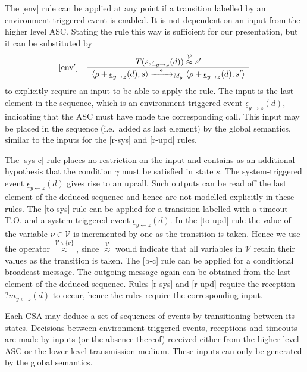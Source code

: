\documentclass{sig-alternate}
\newcommand{\e}{\epsilon}
\newcommand{\V}{\mathcal{V}}
\newcommand{\timeout}{\mathrm{T.O.}}
\newcommand{\locev}[1]{\underline{#1}}
\newcommand{\vareq}[1]{\overset{#1}{\approx}}
\newcommand{\env}[4]{\locev{#1}_{{#2} \rightarrow {#3}}(#4)}
\newcommand{\sys}[4]{\locev{#1}_{{#2} \leftarrow {#3}}(#4)}
\begin{document}
The [env] rule can be applied at any point if a transition labelled by an environment-triggered event is enabled. It is not dependent on an input from the higher level ASC. Stating the rule this way is sufficient for our presentation, but it can be substituted by
\begin{equation*}
\begin{array}{ll}
\text{[env$'$]} &
\frac{
\begin{array}{c}
T(s, \env{\e}{y}{z}{d}) \vareq{\V} s'
\end{array}}{
\begin{array}{c}
\langle \rho + \env{\e}{y}{z}{d}, s \rangle \smallstep{\mathrm{e}}{y} \langle \rho + \env{\e}{y}{z}{d}, s' \rangle
\end{array}}
\end{array}
\end{equation*}
to explicitly require an input to be able to apply the rule. The input is the last element in the sequence, which is an environment-triggered event $\env{\e}{y}{z}{d}$, indicating that the ASC must have made the corresponding call. This input may be placed in the sequence (i.e.\ added as last element) by the global semantics, similar to the inputs for the [r-sys] and [r-upd] rules.

The [sys-c] rule places no restriction on the input and contains as an additional hypothesis that the condition $\gamma$ must be satisfied in state $s$. The system-triggered event $\sys{\e}{y}{z}{d}$ gives rise to an upcall. Such outputs can be read off the last element of the deduced sequence and hence are not modelled explicitly in these rules. The [to-sys] rule can be applied for a transition labelled with a timeout $\timeout$ and a system-triggered event $\sys{\e}{y}{z}{d}$. In the [to-upd] rule the value of the variable $\nu \in \V$ is incremented by one as the transition is taken. Hence we use the operator $\vareq{\V \backslash \{\nu\}}$, since $\vareq{\V}$ would indicate that all variables in $\V$ retain their values as the transition is taken. The [b-c] rule can be applied for a conditional broadcast message. The outgoing message again can be obtained from the last element of the deduced sequence. Rules [r-sys] and [r-upd] require the reception $?m_{y \leftarrow z}(d)$ to occur, hence the rules require the corresponding input.

Each CSA may deduce a set of sequences of events by transitioning between its states. Decisions between environment-triggered events, receptions and timeouts are made by inputs (or the absence thereof) received either from the higher level ASC or the lower level transmission medium. These inputs can only be generated by the global semantics.
\end{document}

